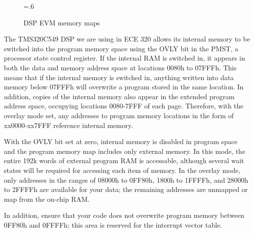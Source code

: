 \begin{figure}[htb]\centerline  {
\epsfxsize=.6\textwidth\
          }
\caption{DSP EVM memory maps}
\label{fig: memmap}
\end{figure}

The TMS320C549 DSP we are using in ECE 320 allows its internal memory to
be switched into the program memory space using the OVLY bit in the PMST,
a processor state control register. If the internal RAM is switched in,
it appears in both the data and memory address space at locations 0080h to
07FFFh. This means that if the internal memory is switched in, anything
written into data memory below 07FFFh will overwrite a program stored in
the same location. In addition, copies of the internal memory also appear
in the extended program address space, occupying locations 0080-7FFF of
each page. Therefore, with the overlay mode set, any addresses to program
memory locations in the form of xx0000-xx7FFF reference internal memory.

With the OVLY bit set at zero, internal memory is disabled in program space
and the program memory map includes only external memory. In this mode, the
entire 192k words of external program RAM is accessable, although
several wait states will be required for accessing each item of memory.
In the overlay mode, only addresses in the ranges of 08000h to 0FF80h,
1800h to 1FFFFh, and 28000h to 2FFFFh are available for your data; the
remaining addresses are unmapped or map from the on-chip RAM.

In addition, ensure that your code does not overwrite program memory between
0FF80h and 0FFFFh; this area is reserved for the interrupt vector table.

